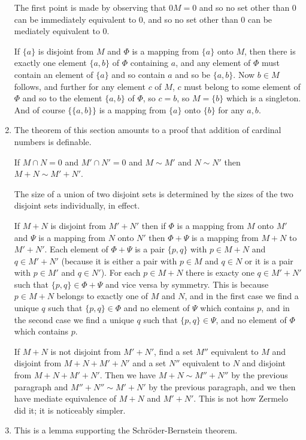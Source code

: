 \documentclass[12pt]{article}
\begin{document}
\begin{enumerate}
The first point is made by observing that $0M = 0$ and so no set other than 0 can be immediately equivalent to 0, and so no set other than 0 can be mediately equivalent to 0.

If $\{a\}$ is disjoint from $M$ and $\Phi$ is a mapping from $\{a\}$ onto $M$, then there is exactly one element $\{a,b\}$ of $\Phi$ containing $a$,
and any element of $\Phi$ must contain an element of $\{a\}$ and so contain $a$ and so be $\{a,b\}$.  Now $b \in M$ follows, and further for any element $c$ of $M$,
$c$ must belong to some element of $\Phi$ and so to the element $\{a,b\}$ of $\Phi$, so $c=b$, so $M = \{b\}$ which is a singleton.  And of course $\{\{a,b\}\}$ is a mapping from $\{a\}$ onto $\{b\}$ for any $a,b$.

\item  The theorem of this section amounts to a proof that addition of cardinal numbers is definable.

If $M \cap N = 0$ and $M' \cap N'=0$ and $M\sim M'$ and $N\sim N'$ then $M+N \sim M'+N'$.

The size of a union of two disjoint sets is determined by the sizes of the two disjoint sets individually, in effect.

If $M+N$ is disjoint from $M'+N'$ then if $\Phi$ is a mapping from $M$ onto $M'$ and $\Psi$ is a mapping from $N$ onto $N'$ then
$\Phi + \Psi$ is a mapping from $M+N$ to $M'+N'$.  Each element of $\Phi + \Psi$ is a pair $\{p,q\}$ with $p \in M+N$ and $q\in M'+N'$ (because it is either a pair with
$p \in M$ and $q \in N$ or it is a pair with $p\in M'$ and $q \in N'$).  For each $p \in M+N$ there is exacty one $q \in M'+N'$ such that $\{p,q\} \in \Phi + \Psi$ and vice versa by symmetry.  This is because $p \in M+N$ belongs to exactly one of $M$ and $N$, and in the first case we find a unique $q$ such that $\{p,q\} \in \Phi$ and no element of $\Psi$ which contains $p$,
and in the second case we find a unique $q$ such that $\{p,q\} \in \Psi$, and no element of $\Phi$ which contains $p$.

If $M+N$ is not disjoint from $M'+N'$, find a set $M''$ equivalent to $M$ and disjoint from $M+N+M'+N'$ and a set $N''$ equivalent to $N$ and disjoint from $M+N+M'+N'$.
Then we have $M+N \sim M''+N''$ by the previous paragraph and $M''+N'' \sim M'+N'$ by the previous paragraph, and we then have mediate equivalence of $M+N$ and $M'+N'$.  This is not how Zermelo did it;  it is noticeably simpler.

\item This is a lemma supporting the Schr\"oder-Bernstein theorem.


\end{enumerate}
\end{document}
